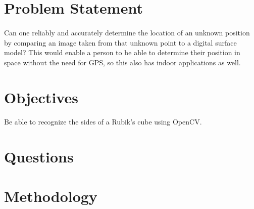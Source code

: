 \documentclass{article}
\begin{document}
\section{Problem Statement}
\paragraph{}
Can one reliably and accurately determine the location of an unknown position by comparing an image taken from that unknown point to a digital surface model? This would enable a person to be able to determine their position in space without the need for GPS, so this also has indoor applications as well.

\section{Objectives}
\paragraph{}
Be able to recognize the sides of a Rubik's cube using OpenCV.

\section{Questions}


\section{Methodology}
\end{document}
